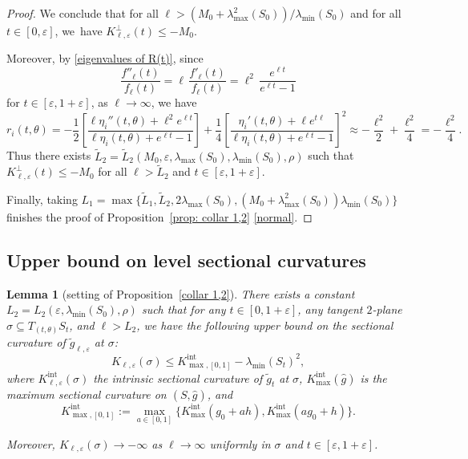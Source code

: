 \documentclass[10pt]{amsart}
\newcommand{\Int}{\mathrm{int}}
\newtheorem{lemma}[theorem]{Lemma}
\theoremstyle{definition}
\let\eps\varepsilon
\renewcommand{\>}{{\rangle}}
\newcommand{\<}{{\langle}}
\providecommand{\skpt}{\par\smallskip\noindent}
\let\Subsection\subsection\let\Subsubsection\subsubsection
\begin{document}
\begin{proof}
We conclude that for all $\ell>({M_0+\lambda^2_{\max}(S_0)})/{\lambda_{\min}(S_0)}$ and for all $t\in[0,\eps]$, we~have $K^\perp_{\ell,\eps}(t)\leq -M_0$.

Moreover, by \eqref{eigenvalues of R(t)}, since
\[
\frac{f''_\ell(t)}{f_\ell(t)}=\ell\,\frac{f'_\ell(t)}{f_\ell(t)}=\ell^2\,\frac{e^{\ell t}}{e^{\ell t}-1}
\]
for $t\in[\eps,1+\eps]$, as $\ell\to\infty$, we have
\[
r_i(t,\theta)=-\frac{1}{2}\left[\frac{\ell\eta_i''(t,\theta)+\ell^2e^{\ell t}}{\ell\eta_i(t,\theta)+e^{\ell t}-1}\right]+\frac{1}{4}\left[\frac{\eta_i'(t,\theta)+\ell e^{t\ell}}{\ell\eta_i(t,\theta)+e^{\ell t}-1}\right]^2\approx -\frac{\ell^2}{2}+\frac{\ell^2}{4}=-\frac{\ell^2}{4}.
\]
Thus there exists $\tilde L_2=\tilde L_2(M_0,\eps, \lambda_{\max}(S_0), \lambda_{\min}(S_0), \rho)$ such that $K^\perp_{\ell,\eps}(t)\leq-M_0$ for all $\ell>\tilde L_2$ and $t\in[\eps,1+\eps]$.

Finally, taking $L_1 = \max\{\tilde L_1, \tilde L_2,2\lambda_{\max}(S_0),({M_0+\lambda^2_{\max}(S_0)}){\lambda_{\min}(S_0)}\}$ finishes the proof of Proposition~\ref{prop: collar 1,2} \eqref{normal}.
\end{proof}

\Subsection{Upper bound on level sectional curvatures}

\skpt
\begin{lemma}[setting of Proposition~\ref{collar 1,2}]\label{lem: bound_level_curv_C12}
There exists a constant \hbox{$L_2=L_2(\eps, \lambda_{\min}(S_0),\rho)$} such that for any $t\in [0,1+\eps]$, any tangent $2$-plane $\sigma\subseteq T_{(t,\theta)}S_t$, and $\ell>L_2$, we have the following upper bound on the sectional curvature of $\tilde g_{\ell,\eps}$ at $\sigma$:
\begin{equation*}
K_{\ell,\eps}(\sigma)\leq K^{\Int}_{\max,[0,1]}-\lambda_{\min}(S_t)^2,
\end{equation*} where $K^{\Int}_{\ell,\eps}(\sigma)$ the intrinsic sectional curvature of $\tilde{g}_t$ at $\sigma$, $K^{\Int}_{\max}(\hat g)$ is the maximum sectional curvature on $(S,\hat g)$, and
\begin{equation*}
K^{\Int}_{\max,[0,1]} := \max_{a\in[0,1]}\{K^{\Int}_{\max}(g_0+a h), K^{\Int}_{\max}(ag_0+h) \}.
\end{equation*}

Moreover, $K_{\ell,\eps}(\sigma)\to -\infty$ as $\ell\to\infty$ uniformly in $\sigma$ and $t\in[\eps, 1+\eps]$.
\end{lemma}
\end{document}
